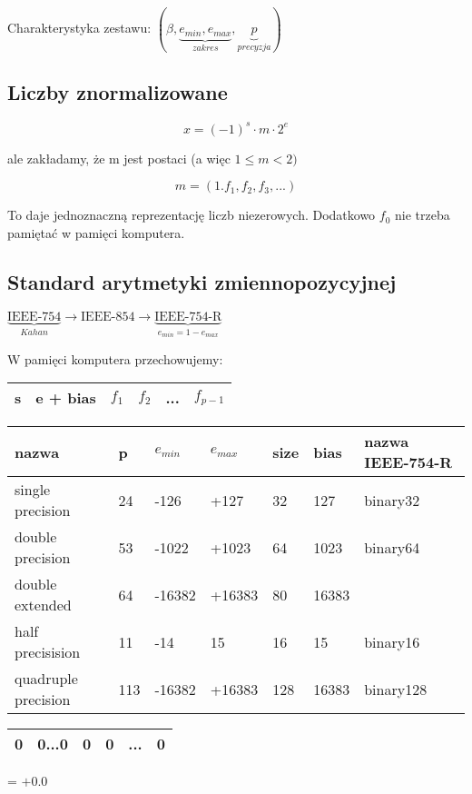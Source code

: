 \documentclass[hidelinks,a4paper]{article}
\begin{document}
Charakterystyka zestawu: $(\beta, \underbrace{e_{min}, e_{max}}_{zakres}, \underbrace{p}_{precyzja})$

\subsection{Liczby znormalizowane}

\[
	x = (-1)^s \cdot m \cdot 2^e
\]

ale zakładamy, że m jest postaci (a więc $1 \leq m < 2)$

\[
	m = (1.f_1,f_2,f_3,...)
\]

To daje jednoznaczną reprezentację liczb niezerowych. Dodatkowo $f_0$ nie trzeba pamiętać w pamięci komputera.

\subsection{Standard arytmetyki zmiennopozycyjnej}

$\underbrace{\textrm{IEEE-754}}_{Kahan} \rightarrow \textrm{IEEE-854} \rightarrow \underbrace{\textrm{IEEE-754-R}}_{e_{min} = 1 - e_{max}}$

W pamięci komputera przechowujemy:

\begin{tabular}{|c|c|l|l|l|c|c|c|l|c|}
	\hline
	s & \multicolumn{4}{c|}{e + bias} & $f_1$ & $f_2$ & \multicolumn{2}{c|}{...} & $f_{p-1}$ \\ \hline
\end{tabular}


\begin{longtable}[c]{l|l|l|l|l|l|l}
	nazwa               & p   & $e_{min}$ & $e_{max}$ & size & bias  & nazwa IEEE-754-R \\ \hline
	\endfirsthead
	\endhead
	single precision    & 24  & -126      & +127      & 32   & 127   & binary32         \\ \hline
	double precision    & 53  & -1022     & +1023     & 64   & 1023  & binary64         \\ \hline
	double extended     & 64  & -16382    & +16383    & 80   & 16383 &                  \\ \hline
	half precisision    & 11  & -14       & 15        & 16   & 15    & binary16         \\ \hline
	quadruple precision & 113 & -16382    & +16383    & 128  & 16383 & binary128        
\end{longtable}

\begin{tabular}{|c|c|l|l|l|c|c|c|l|c|}
	\hline
	0 & \multicolumn{4}{c|}{0...0} & 0 & 0 & \multicolumn{2}{c|}{...} & 0 \\ \hline
\end{tabular} = $+0.0$
\end{document}
